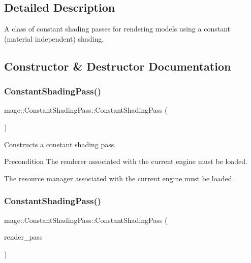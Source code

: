 \subsection{Detailed Description}
A class of constant shading passes for rendering models using a constant (material independent) shading. 

\subsection{Constructor \& Destructor Documentation}
\hypertarget{classmage_1_1_constant_shading_pass_a21a8614cd67999bec82d260eb9aa78d7}{}\label{classmage_1_1_constant_shading_pass_a21a8614cd67999bec82d260eb9aa78d7} 
\subsubsection{\texorpdfstring{Constant\+Shading\+Pass()}{ConstantShadingPass()}\hspace{0.1cm}{\footnotesize\ttfamily [1/3]}}
{\footnotesize\ttfamily mage\+::\+Constant\+Shading\+Pass\+::\+Constant\+Shading\+Pass (\begin{DoxyParamCaption}{ }\end{DoxyParamCaption})}

Constructs a constant shading pass.

\begin{DoxyPrecond}{Precondition}
The renderer associated with the current engine must be loaded. 

The resource manager associated with the current engine must be loaded. 
\end{DoxyPrecond}
\hypertarget{classmage_1_1_constant_shading_pass_a0dd8af518c8f6444368d64f9e24a3a13}{}\label{classmage_1_1_constant_shading_pass_a0dd8af518c8f6444368d64f9e24a3a13} 
\subsubsection{\texorpdfstring{Constant\+Shading\+Pass()}{ConstantShadingPass()}\hspace{0.1cm}{\footnotesize\ttfamily [2/3]}}
{\footnotesize\ttfamily mage\+::\+Constant\+Shading\+Pass\+::\+Constant\+Shading\+Pass (\begin{DoxyParamCaption}\item[{const \hyperlink{classmage_1_1_constant_shading_pass}{Constant\+Shading\+Pass} \&}]{render\+\_\+pass }\end{DoxyParamCaption})\hspace{0.3cm}{\ttfamily [delete]}}

